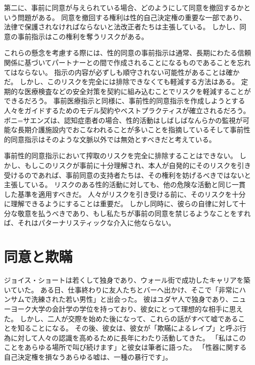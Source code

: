 \documentclass[paper=a4,book,openany]{jlreq} \usepackage{mystyle}
\begin{document}
第二に、事前に同意が与えられている場合、どのようにして同意を撤回するかという問題がある。
同意を撤回する権利は性的自己決定権の重要な一部であり、法律で保護されなければならないと法改正者たちは主張している。
しかし、同意の事前指示はこの権利を奪うリスクがある。

これらの懸念を考慮する際には、性的同意の事前指示は通常、長期にわたる信頼関係に基づいてパートナーとの間で作成されることになるものであることを忘れてはならない。
指示の内容が必ずしも順守されない可能性があることは確かだ。
しかし、このリスクを完全には排除できなくても軽減する方法はある。
定期的な医療検査などの安全対策を契約に組み込むことでリスクを軽減することができるだろう。
事前医療指示と同様に、事前性的同意指示を作成しようとする人々をガイドするためのモデル契約やベストプラクティスが確立されるだろう。
ボニ=サエンズは、認知症患者の場合、性的活動はしばしばなんらかの監視が可能な長期介護施設内でおこなわれることが多いことを指摘している{\DDASH}そして事前性的同意指示はそのような文脈以外では無効とすべきだと考えている\citep[p.43]{boni-saenz15:_sexual_incap}。

事前性的同意指示において搾取のリスクを完全に排除することはできない。
しかし、もしこのリスクが事前に十分理解され、本人が自発的にそのリスクを引き受けるのであれば、事前同意の支持者たちは、その権利を妨げるべきではないと主張している。
リスクのある性的活動に対しても、他の危険な活動と同じ一貫した基準を適用すべきだ。
人々がリスクを引き受ける前に、そのリスクを十分に理解できるようにすることは重要だ。
しかし同時に、彼らの自律に対して十分な敬意を払うべきであり、もし私たちが事前の同意を禁じるようなことをすれば、それはパターナリスティックな介入に他ならない。

\section{同意と欺瞞}

ジョイス・ショートは若くして独身であり、ウォール街で成功したキャリアを築いていた。
ある日、仕事終わりに友人たちとバーへ出かけ、そこで「非常にハンサムで洗練された若い男性」と出会った。
彼はユダヤ人で独身であり、ニューヨーク大学の会計学の学位を持っており、彼女にとって理想的な相手に思えた。
しかし、二人が交際を始めた後になって、これらの話がすべて嘘であることを知ることになる。
その後、彼女は、彼女が「欺瞞によるレイプ」と呼ぶ行為に対して人々の認識を高めるために長年にわたり活動してきた。
「私はこのことをあらゆる場所で叫び続けます」と彼女は筆者に語った。
「性器に関する自己決定権を損なうあらゆる嘘は、一種の暴行です」\citep{mcarthur16:_is_lying_get_laid_form_sexual_assaul}。
\end{document}
